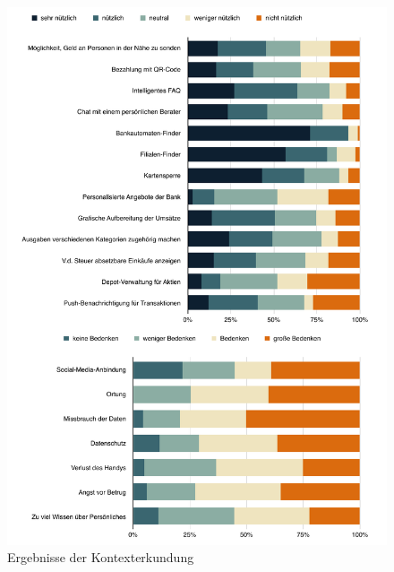 \begin{figure}[p]
	\centering
	\includegraphics[scale=.69]{Pictures/Kontexterkundung}
	\caption{Ergebnisse der Kontexterkundung}
\end{figure}